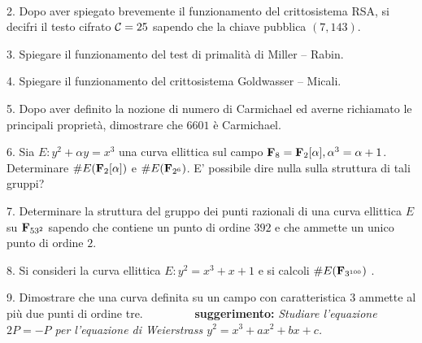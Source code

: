 \ \dotfill\ \bigskip\bigskip\bigskip

\item{2.} Dopo aver spiegato brevemente il funzionamento del crittosistema RSA, si decifri il testo cifrato ${\cal C}=25$ 
sapendo che la chiave pubblica $(7,143)$. 
\vfill\eject\ \vskip-2cm

\item{3.} Spiegare il funzionamento del test di primalit\`a di Miller -- Rabin.\vfill

\item{4.} Spiegare il funzionamento del crittosistema Goldwasser -- Micali.\vfill\eject\ \vskip-2cm


\item{5.} Dopo aver definito la nozione di numero di Carmichael ed averne richiamato le principali propriet\`a, dimostrare che
$6601$ \`e Carmichael.
\vfill

\item{6.} Sia $E: y^2+\alpha y=x^3$ una curva ellittica sul campo ${\bf F}_8={\bf F}_2[\alpha], \alpha^3=\alpha+1$. Determinare
$\#E({\bf F}_2[\alpha])$ e $\#E({\bf F}_{2^6})$. E' possibile dire nulla sulla struttura di tali gruppi?
\vfill\eject\ \vskip-2cm

\item{7.} Determinare la struttura del gruppo dei punti razionali di una curva ellittica $E$ su ${\bf F}_{53^2}$ sapendo che contiene un 
punto di ordine $392$ e
che ammette un unico punto di ordine $2$.\vfill

\item{8.} Si consideri la curva ellittica $E: y^2=x^3+x+1$ e si calcoli $\#E({\bf F}_{3^{100}})$ .\vfill

\item{9.} Dimostrare che una curva definita su un campo con caratteristica $3$ ammette al pi\`u due punti di ordine tre.\hfill\break 
$\ {}\qquad\qquad$\hfill{\bf suggerimento:} \it Studiare l'equazione 
$2P=-P$ per l'equazione di Weierstrass $y^2=x^3+ax^2+bx+c$.

\vfill \eject\bye
